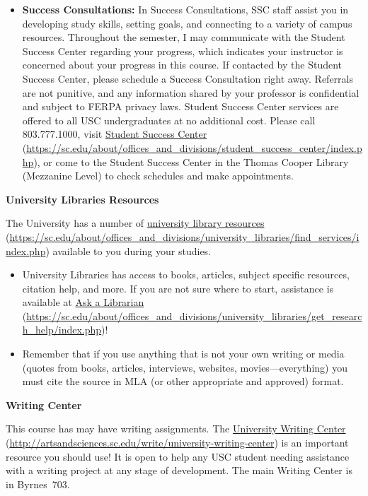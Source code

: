 \documentclass[11pt,letterpaper]{article}
\begin{document}
\begin{itemize}
	\item {\bfseries Success Consultations:} In Success Consultations, SSC staff assist you in developing study skills, setting goals, and connecting to a variety of campus resources. Throughout the semester, I may communicate with the Student Success Center regarding your progress, which indicates your instructor is concerned about your progress in this course. If contacted by the Student Success Center, please schedule a Success Consultation right away. Referrals are not punitive, and any information shared by your professor is confidential and subject to FERPA privacy laws. Student Success Center services are offered to all USC undergraduates at no additional cost. Please call 803.777.1000, visit \href{https://sc.edu/about/offices\_and\_divisions/student\_success\_center/index.php}{Student Success Center} (\url{https://sc.edu/about/offices\_and\_divisions/student\_success\_center/index.php}), or come to the Student Success Center in the Thomas Cooper Library (Mezzanine Level) to check schedules and make appointments.
	\end{itemize} \pvspace{0.1cm}
	
{\bfseries University Libraries Resources} \par
The University has a number of \href{https://sc.edu/about/offices\_and\_divisions/university\_libraries/find\_services/index.php}{university library resources} (\url{https://sc.edu/about/offices\_and\_divisions/university\_libraries/find\_services/index.php}) available to you during your studies.
	\begin{itemize}
	\item University Libraries has access to books, articles, subject specific resources, citation help, and more. If you are not sure where to start, assistance is available at \href{https://sc.edu/about/offices\_and\_divisions/university\_libraries/get\_research\_help/index.php}{Ask a Librarian} (\url{https://sc.edu/about/offices\_and\_divisions/university\_libraries/get\_research\_help/index.php})!
	\item Remember that if you use anything that is not your own writing or media (quotes from books, articles, interviews, websites, movies---everything) you must cite the source in MLA (or other appropriate and approved) format.
	\end{itemize} \pvspace{0.1cm}

{\bfseries Writing Center} \par
This course has may have writing assignments. The \href{http://artsandsciences.sc.edu/write/university-writing-center}{University Writing Center} (\url{http://artsandsciences.sc.edu/write/university-writing-center}) is an important resource you should use! It is open to help any USC student needing assistance with a writing project at any stage of development. The main Writing Center is in Byrnes~703. \sectionbreak
\end{document}
